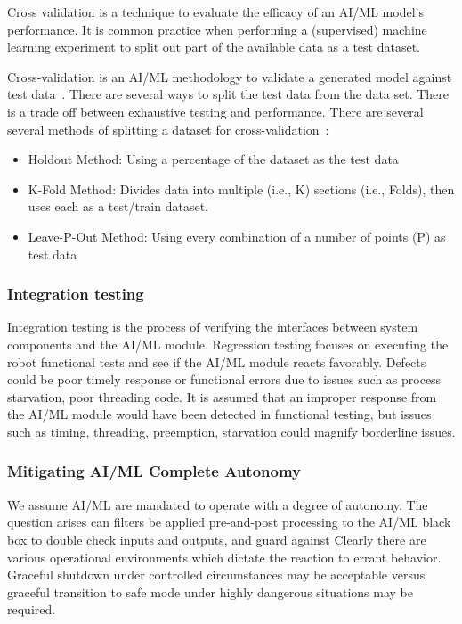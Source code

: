 Cross validation is a technique to evaluate the efficacy of an AI/ML model's performance. It is common practice when performing a (supervised) machine learning experiment to split out part of the available data as a test dataset. 

Cross-validation is an AI/ML methodology to validate a generated model against test data~\cite{dataflair-crossvalidation}. There are several ways to split the test data from the data set. There is a trade off between exhaustive testing and performance. There are several several methods of splitting a dataset for cross-validation~\cite{crossvalidation}:

\begin{itemize}
\item Holdout Method: Using a percentage of the dataset  as the test data
\item K-Fold Method: Divides data into multiple (i.e., K) sections (i.e., Folds), then uses each as a test/train dataset.
\item Leave-P-Out Method: Using every combination of a number of points (P) as test data
\end{itemize}





\subsubsection{Integration testing}

Integration testing is the process of verifying the interfaces between system
components and the AI/ML module. Regression testing focuses on executing the robot functional tests and see if the AI/ML module reacts favorably. Defects could be  poor timely response or  functional errors due to  issues such as process starvation, poor threading code.     It is assumed that an improper response from the AI/ML module would have been detected in functional testing, but issues such as timing, threading, preemption, starvation could magnify borderline issues.

\subsubsection{Mitigating AI/ML Complete Autonomy}

We assume AI/ML are mandated to operate with a degree of autonomy. The question arises can filters be applied pre-and-post processing to the AI/ML black box to double check inputs and outputs, and guard against  Clearly there are various operational environments which dictate the reaction to errant behavior. Graceful shutdown under controlled circumstances  may be acceptable versus graceful transition to safe mode under highly dangerous situations may be required.
